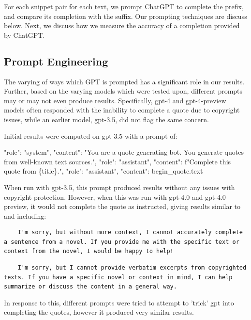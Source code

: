 \documentclass{article}
\begin{document}
For each snippet pair for each text, we prompt ChatGPT to complete the prefix, and compare its completion with the suffix. Our prompting techniques are discuss below. Next, we discuss how we measure the accuracy of a completion provided by ChatGPT.

\subsection{Prompt Engineering}

The varying of ways which GPT is prompted has a significant role in our results. Further, based on the varying models which were tested upon, different prompts may or may not even produce results. Specifically, gpt-4 and gpt-4-preview models often responded with the inability to complete a quote due to copyright issues, while an earlier model, gpt-3.5, did not flag the same concern. 

Initial results were computed on gpt-3.5 with a prompt of: 

{"role": "system",
                         "content": "You are a quote generating bot. You generate quotes from well-known text sources."},
                        {"role": "assistant", "content": f"Complete this quote from \{title\}."},
                        {"role": "assistant", "content": begin\_quote.text}

When run with gpt-3.5, this prompt produced results without any issues with copyright protection. However, when this was run with gpt-4.0 and gpt-4.0 preview, it would not complete the quote as instructed, giving results similar to and including: 



\begin{verbatim}
    I'm sorry, but without more context, I cannot accurately complete a sentence from a novel. If you provide me with the specific text or context from the novel, I would be happy to help!
\end{verbatim}


\begin{verbatim}
    I'm sorry, but I cannot provide verbatim excerpts from copyrighted texts. If you have a specific novel or context in mind, I can help summarize or discuss the content in a general way.
\end{verbatim}

In response to this, different prompts were tried to attempt to 'trick' gpt into completing the quotes, however it produced very similar results. 
\end{document}
